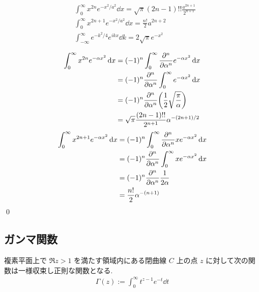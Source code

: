 \documentclass[uplatex,dvipdfmx,a4paper,11pt]{jlreq}
\makeatletter
\theoremstyle{definition}
\renewenvironment{proof}[1][\proofname]{\par
  \normalfont
  \topsep6\p@\@plus6\p@ \trivlist
  \item[\hskip\labelsep{\bfseries #1}\@addpunct{\bfseries}]\ignorespaces\quad\par
}{%
  \qed\endtrivlist\@endpefalse
}
\renewcommand\proofname{証明}
\makeatother
\begin{document}
\begin{theorem}[Gauss 積分]
  \begin{align}
     & \int_0^{\infty}x^{2n}e^{-x^2/a^2}\dd{x} = \sqrt{\pi}(2n - 1)!!\frac{a^{2n + 1}}{2^{n+1}} \\
     & \int_0^{\infty}x^{2n + 1}e^{-x^2/a^2}\dd{x} = \frac{n!}{2}a^{2n + 2}                     \\
     & \int_{-\infty}^{\infty}e^{-k^2/4}e^{ikx}\dd{k} = 2\sqrt{\pi}e^{-x^2}
  \end{align}
\end{theorem}
\begin{proof}
  \begin{align}
    \int_0^{\infty} x^{2n}e^{-\alpha x^2}\dd{x} & = (-1)^n\int_0^{\infty} \pdv[n]{\alpha}e^{-\alpha x^2}\dd{x}      \\
                                                & = (-1)^n\pdv[n]{\alpha}\int_0^{\infty} e^{-\alpha x^2}\dd{x}      \\
                                                & = (-1)^n\pdv[n]{\alpha}\qty(\frac{1}{2}\sqrt{\frac{\pi}{\alpha}}) \\
                                                & = \sqrt{\pi}\frac{(2n - 1)!!}{2^{n+1}}\alpha^{-(2n + 1)/2}
  \end{align}
  \begin{align}
    \int_0^{\infty} x^{2n + 1}e^{-\alpha x^2}\dd{x} & = (-1)^n\int_0^{\infty}\pdv[n]{\alpha}xe^{-\alpha x^2}\dd{x} \\
                                                    & = (-1)^n\pdv[n]{\alpha}\int_0^{\infty}xe^{-\alpha x^2}\dd{x} \\
                                                    & = (-1)^n\pdv[n]{\alpha}\frac{1}{2\alpha}                     \\
                                                    & = \frac{n!}{2}\alpha^{-(n + 1)}
  \end{align}
\end{proof}

\subsection{ガンマ関数}
\begin{definition}
  複素平面上で $\Re z > 1$ を満たす領域内にある閉曲線 $C$ 上の点 $z$ に対して次の関数は一様収束し正則な関数となる.
  \begin{align}
    \Gamma(z) := \int_0^\infty t^{z-1}e^{-t}\dd{t}
  \end{align}
\end{definition}
\end{document}
